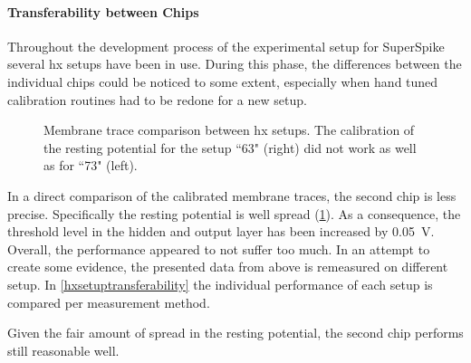 \paragraph{Transferability between Chips}
Throughout the development process of the experimental setup for SuperSpike several \gls{hx} setups have been in use. During this phase, the differences between the individual chips could be noticed to some extent, especially when hand tuned calibration routines had to be redone for a new setup.
\begin{figure}[b!]
	\begin{subfigure}{0.5\textwidth}
		\centering
		
	\end{subfigure}
	\begin{subfigure}{0.5\textwidth}
		\centering
		
	\end{subfigure}
	\caption[Membrane trace comparison between \gls{hx} setups.]{Membrane trace comparison between \gls{hx} setups. The calibration of the resting potential for the setup ``63" (right) did not work as well as for ``73" (left).}
	\label{hxsetupmemtracescomparison}
\end{figure}
In a direct comparison of the calibrated membrane traces, the second chip is less precise. Specifically the resting potential is well spread (\cref{hxsetupmemtracescomparison}). As a consequence, the threshold level in the hidden and output layer has been increased by \SI{0.05}{V}. Overall, the performance appeared to not suffer too much. In an attempt to create some evidence, the presented data from above is remeasured on different setup. In \cref{hxsetuptransferability} the individual performance of each setup is compared per measurement method.

Given the fair amount of spread in the resting potential, the second chip performs still reasonable well.

